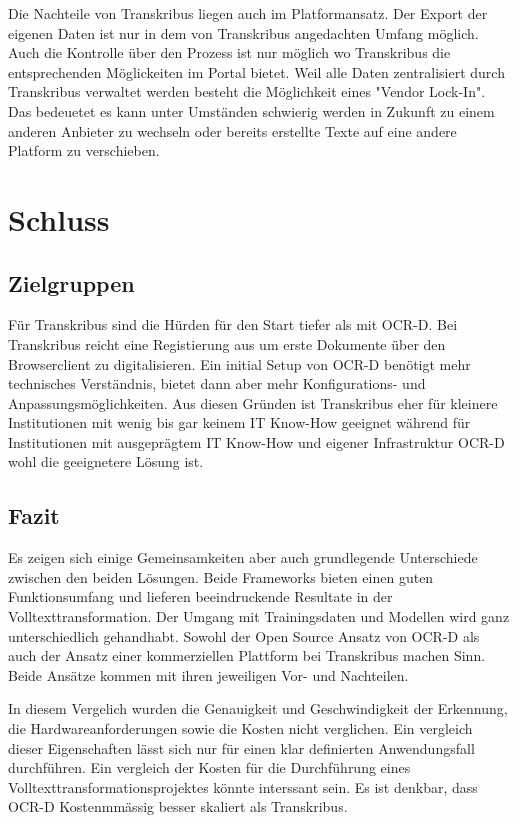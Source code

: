 \documentclass[a4paper,oneside, 12pt]{report}
\begin{document}
Die Nachteile von Transkribus liegen auch im Platformansatz. Der Export der eigenen Daten ist nur in dem von Transkribus angedachten Umfang möglich. Auch die Kontrolle über den Prozess ist nur möglich wo Transkribus die entsprechenden Möglickeiten im Portal bietet. Weil alle Daten zentralisiert durch Transkribus verwaltet werden besteht die Möglichkeit eines "Vendor Lock-In". Das bedeuetet es kann unter Umständen schwierig werden in Zukunft zu einem anderen Anbieter zu wechseln oder bereits erstellte Texte auf eine andere Platform zu verschieben.

\chapter{Schluss}\label{sec:schluss}

\section{Zielgruppen}
Für Transkribus sind die Hürden für den Start tiefer als mit OCR-D. Bei Transkribus reicht eine Registierung aus um erste Dokumente über den Browserclient zu digitalisieren. Ein initial Setup von OCR-D benötigt mehr technisches Verständnis, bietet dann aber mehr Konfigurations- und Anpassungsmöglichkeiten. Aus diesen Gründen ist Transkribus eher für kleinere Institutionen mit wenig bis gar keinem IT Know-How geeignet während für Institutionen mit ausgeprägtem IT Know-How und eigener Infrastruktur OCR-D wohl die geeignetere Lösung ist.

\section{Fazit}
Es zeigen sich einige Gemeinsamkeiten aber auch grundlegende Unterschiede zwischen den beiden Lösungen. Beide Frameworks bieten einen guten Funktionsumfang und lieferen beeindruckende Resultate in der Volltexttransformation. Der Umgang mit Trainingsdaten und Modellen wird ganz unterschiedlich gehandhabt. Sowohl der Open Source Ansatz von OCR-D als auch der Ansatz einer kommerziellen Plattform bei Transkribus machen Sinn. Beide Ansätze kommen mit ihren jeweiligen Vor- und Nachteilen. 

In diesem Vergelich wurden die Genauigkeit und Geschwindigkeit der Erkennung, die Hardwareanforderungen sowie die Kosten nicht verglichen. Ein vergleich dieser Eigenschaften lässt sich nur für einen klar definierten Anwendungsfall durchführen. Ein vergleich der Kosten für die Durchführung eines Volltexttransformationsprojektes könnte interssant sein. Es ist denkbar, dass OCR-D Kostenmmässig besser skaliert als Transkribus.
\end{document}
